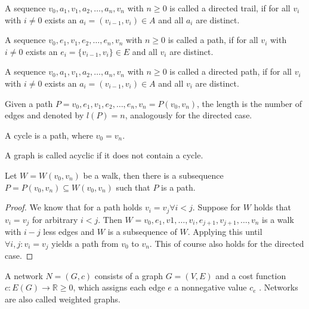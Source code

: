 \begin{definition}
A sequence $v_0,a_1,v_1,a_2,\ldots ,a_n,v_n$ with $n \geq 0$ is called a directed trail, if for all $v_i$ with $i \neq 0$ exists an $a_i = (v_{i-1}, v_i) \in A$ and all $a_i$ are distinct.
\end{definition}
\begin{definition}[Path]
A sequence $v_0,e_1,v_1,e_2,\ldots , e_n,v_n$ with $n \geq 0$ is called a path, if for all $v_i$ with $i \neq 0$ exists an $e_i = \{v_{i-1} , v_i\} \in E$ and all $v_i$ are distinct.
\end{definition}
\begin{definition}
A sequence $v_0,a_1,v_1,a_2,\ldots ,a_n,v_n$ with $n \geq 0$ is called a directed path, if for all $v_i$ with $i \neq 0$ exists an $a_i = (v_{i-1}, v_i) \in A$ and all $v_i$ are distinct.
\end{definition}
\begin{definition}
Given a path $P = v_0,e_1,v_1,e_2,\ldots ,e_n,v_n = P(v_0,v_n)$, the length is the number of edges and denoted by $l(P) = n$, analogously for the directed case.
\end{definition}
\begin{definition}[Cycle]
A cycle is a path, where $v_0 = v_n$.
\end{definition}
\begin{definition}
A graph is called acyclic if it does not contain a cycle.
\end{definition}
\begin{theorem}
Let $W = W(v_0,v_n)$ be a walk, then there is a subsequence $P = P(v_0,v_n) \subseteq W(v_0,v_n)$ such that $P$ is a path.
\label{theo:pathinwalk}
\end{theorem}
\begin{proof}
We know that for a path holds $v_i = v_j \forall i < j$. Suppose for $W$ holds that $v_i = v_j$ for arbitrary $i < j$. Then $W = v_0,e_1,v1,\ldots,v_i,e_{j+1},v_{j+1},\ldots,v_n$ is a walk with $i-j$ less edges and $W$ is a subsequence of $W$. Applying this until $\forall i, j : v_i = v_j$ yields a path from $v_0$ to $v_n$. This of course also holds for the directed case.
\end{proof}
\begin{definition}[Network]
A network $N = (G, c)$ consists of a graph $G = (V, E)$ and a cost function $c : E(G) \longrightarrow \mathbb{R} \geq 0$, which assigns each edge $e$ a nonnegative value $c_e$ . Networks are also called weighted graphs.
\end{definition}
